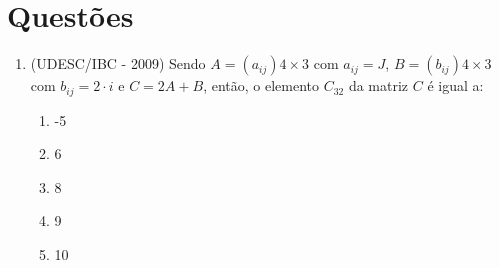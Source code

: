 \section{Questões}
\begin{enumerate}
\item (UDESC/IBC - 2009) Sendo $A = (a_{ij}) 4 \times 3$ com $a_{ij} = J$, $B= (b_{ij}) 4 \times 3$ com $b_{ij} = 2\cdot i$ e $C = 2 A + B$, então, o elemento $C_{32}$ da matriz $C$ é igual a:
\begin{enumerate}
\item -5
\item 6
\item 8
\item 9
\item 10
\end{enumerate}

\end{enumerate}
